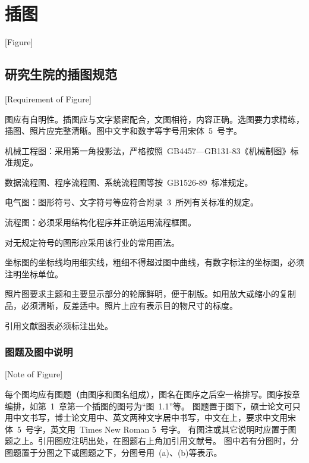 
%
%
%

\chapter{插图}[Figure]
\label{chap05}

\section{研究生院的插图规范}[Requirement of Figure]

图应有自明性。插图应与文字紧密配合，文图相符，内容正确。选图要力求精练，插图、照片应完整清晰。图中文字和数字等字号用宋体~5~号字。

机械工程图：采用第一角投影法，严格按照~GB4457---GB131-83《机械制图》标准规定。

数据流程图、程序流程图、系统流程图等按~GB1526-89~标准规定。

电气图：图形符号、文字符号等应符合附录~3~所列有关标准的规定。

流程图：必须采用结构化程序并正确运用流程框图。

对无规定符号的图形应采用该行业的常用画法。

坐标图的坐标线均用细实线，粗细不得超过图中曲线，有数字标注的坐标图，必须注明坐标单位。

照片图要求主题和主要显示部分的轮廓鲜明，便于制版。如用放大或缩小的复制品，必须清晰，反差适中。照片上应有表示目的物尺寸的标度。

引用文献图表必须标注出处。


\subsection{图题及图中说明}[Note of Figure]

每个图均应有图题（由图序和图名组成），图名在图序之后空一格排写。图序按章编排，如第~1~章第一个插图的图号为“图~1.1”等。
图题置于图下，硕士论文可只用中文书写，博士论文用中、英文两种文字居中书写，中文在上，要求中文用宋体~5~号字，英文用~Times New Roman 5~号字。
有图注或其它说明时应置于图题之上。引用图应注明出处，在图题右上角加引用文献号。
图中若有分图时，分图题置于分图之下或图题之下，分图号用~(a)、(b)等表示。


